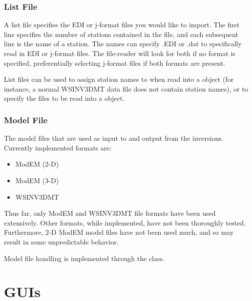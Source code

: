 \documentclass[letterpaper,10pt,english]{sphinxmanual}
\begin{document}
\subsection{List File}
\label{\detokenize{content/api_core/input_files:list-file}}\label{\detokenize{content/api_core/input_files:id4}}
A list file specifies the EDI or j-format files you would like to import.
The first line specifies the number of stations contained in the file, and each subsequent line is the name of a station. The names can specify .EDI or .dat to specifically read in EDI or j-format files. The file-reader will look for both if no format is specified, preferentially selecting j-format files if both formats are present.

List files can be used to assign station names to when read into a {\hyperref[\detokenize{content/api_core/data_structures:data}]{}} object (for instance, a normal WSINV3DMT data file does not contain station names), or to specify the files to be read into a {\hyperref[\detokenize{content/api_core/data_structures:rawdata}]{}} object.


\subsection{Model File}
\label{\detokenize{content/api_core/input_files:model-file}}\label{\detokenize{content/api_core/input_files:id5}}
The model files that are used as input to and output from the inversions.
Currently implemented formats are:
\begin{itemize}
\item {} 
ModEM (2-D)

\item {} 
ModEM (3-D)

\item {} 
WSINV3DMT

\end{itemize}

Thus far, only ModEM and WSINV3DMT file formats have been used extensively. Other formats, while implemented, have not been thoroughly tested. Furthermore, 2-D ModEM model files have not been used much, and so may result in some unpredictable behavior.

Model file handling is implemented through the {\hyperref[\detokenize{content/api_core/data_structures:model}]{}} class.


\chapter{GUIs}
\label{\detokenize{index:guis}}
\end{document}
